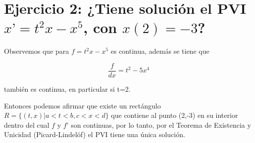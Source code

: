 \section{Ejercicio 2: ¿Tiene solución el PVI $x’ = t^{2}x-x^{5}$, con $x(2)=-3$?}
Observemos que para $ f = t^{2}x-x^{5}$ es continua, además se tiene que \par
\begin{equation*}
  \frac{f}{dx}=t^{2}-5x^{4}  
\end{equation*}


también es continua, en particular si t=2. \par \noindent
Entonces podemos afirmar que existe un rectángulo $R=\{ (t,x) | a<t<b, c<x<d \} $ que contiene al punto (2,-3) en su interior dentro del cual $f$ y $f’$ son continuas, por lo tanto, por el Teorema de Existencia y Unicidad (Picard-Lindelöf) el PVI tiene una única solución.
